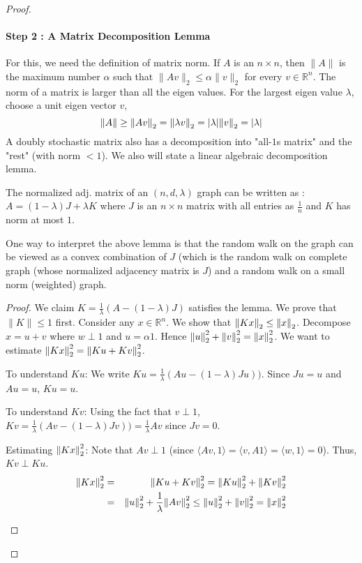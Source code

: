 \begin{proof}
\paragraph{\bf Step 2 : A Matrix Decomposition Lemma} 
For this, we need the definition of matrix norm. If $A$ is an $n \times n$, then $\|A\|$ is the maximum number $\alpha$ such that $\|Av\|_2 \le \alpha \|v\|_2$ for every $v \in\mathbb{R}^n$. The norm of a matrix is larger than all the eigen values. For the largest eigen value $\lambda$, choose a unit eigen vector $v$,
$$\|A\|\ge{\left\lVert Av\right\rVert}_2={\left\lVert\lambda v\right\rVert}_2=|\lambda|{\left\lVert v\right\rVert}_2=|\lambda|$$
 A doubly stochastic matrix also has a decomposition into "all-$1$s matrix" and the "rest" (with norm $< 1$).
We also will state a linear algebraic decomposition lemma. 
\begin{lemma}
The normalized adj. matrix of an $(n,d,\lambda)$ graph can be written as :
$A = (1-\lambda)J+\lambda K$ where $J$ is an $n \times n$ matrix with all entries as $\frac{1}{n}$ and $K$ has norm at most $1$.
\end{lemma}
One way to interpret the above lemma is that the random walk on the graph can be viewed as a convex combination of $J$ (which is the random walk on complete graph (whose normalized adjacency matrix is $J$) and a random walk on a small norm (weighted) graph.

\begin{proof}
We claim $K = \frac{1}{\lambda}(A-(1-\lambda)J)$ satisfies the lemma. We prove that $\|K\| \le 1$ first. Consider any $x \in \mathbb{R}^n$. We show that ${\left\lVert Kx\right\rVert}_2 \le {\left\lVert x\right\rVert}_2$. Decompose $x = u+v$ where $w \perp 1$ and $u = \alpha 1$. Hence ${\left\lVert u\right\rVert}_2^2+{\left\lVert v\right\rVert}_2^2 = {\left\lVert x\right\rVert}_2^2$. We want to estimate ${\left\lVert Kx\right\rVert}_2^2 = {\left\lVert Ku+Kv\right\rVert}_2^2$. 

\begin{description}
\item{To understand $Ku$:} We write $Ku = \frac{1}{\lambda}(Au-(1-\lambda)Ju))$. Since $Ju = u$ and $Au = u$, $Ku = u$.\\[-8mm]
\item{To understand $Kv$:} Using the fact that $v \perp 1$, $Kv = \frac{1}{\lambda}(Av-(1-\lambda)Jv)) = \frac{1}{\lambda}Av$ since $Jv = 0$.\\[-8mm]
\item{Estimating ${\left\lVert Kx\right\rVert}_2^2$:} Note that $Av \perp 1$ (since $\langle Av, 1\rangle = \langle v,A1 \rangle = \langle w,1 \rangle = 0$). Thus, $Kv \perp Ku$.
\begin{eqnarray*}
{\left\lVert Kx\right\rVert}_2^2 & = & {\left\lVert Ku+Kv\right\rVert}_2^2 = {\left\lVert Ku\right\rVert}_2^2+{\left\lVert Kv\right\rVert}_2^2 \\
& = & {\left\lVert u\right\rVert}_2^2+\frac{1}{\lambda}{\left\lVert Av\right\rVert}_2^2 \le {\left\lVert u\right\rVert}_2^2+{\left\lVert v\right\rVert}_2^2 = {\left\lVert x\right\rVert}_2^2
\end{eqnarray*}
\end{description}
\vspace{-12mm}
\end{proof}


\end{proof}
